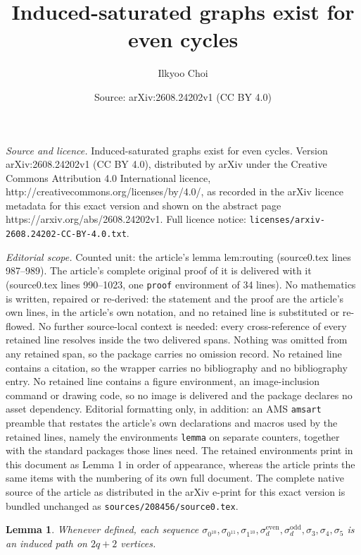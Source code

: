 \documentclass[10pt,a4paper]{amsart}
\title{Induced-saturated graphs exist for even cycles}
\author{Ilkyoo Choi}
\date{Source: arXiv:2608.24202v1 (CC BY 4.0)}
\newtheorem{lemma}{Lemma}
\begin{document}
\maketitle

\noindent\emph{Source and licence.} Induced-saturated graphs exist for even cycles. Version arXiv:2608.24202v1 (CC BY 4.0), distributed by arXiv under the Creative Commons Attribution 4.0 International licence, http://creativecommons.org/licenses/by/4.0/, as recorded in the arXiv licence metadata for this exact version and shown on the abstract page https://arxiv.org/abs/2608.24202v1. Full licence notice: \texttt{licenses/arxiv-2608.24202-CC-BY-4.0.txt}.\par\smallskip

\noindent\textit{Editorial scope.} Counted unit: the article's lemma lem:routing (source0.tex lines 987--989). The article's complete original proof of it is delivered with it (source0.tex lines 990--1023, one \texttt{proof} environment of 34 lines). No mathematics is written, repaired or re-derived: the statement and the proof are the article's own lines, in the article's own notation, and no retained line is substituted or re-flowed.  No further source-local context is needed: every cross-reference of every retained line resolves inside the two delivered spans.  Nothing was omitted from any retained span, so the package carries no omission record.  No retained line contains a citation, so the wrapper carries no bibliography and no bibliography entry.  No retained line contains a figure environment, an image-inclusion command or drawing code, so no image is delivered and the package declares no asset dependency.  Editorial formatting only, in addition: an AMS \texttt{amsart} preamble that restates the article's own declarations and macros used by the retained lines, namely the environments \texttt{lemma} on separate counters, together with the standard packages those lines need.  The retained environments print in this document as Lemma 1 in order of appearance, whereas the article prints the same items with the numbering of its own full document.  The complete native source of the article as distributed in the arXiv e-print for this exact version is bundled unchanged as \texttt{sources/208456/source0.tex}.
\begin{lemma}\label{lem:routing}
Whenever defined, each sequence $\sigma_{0^{10}}, \sigma_{0^{11}}, \sigma_{1^{10}}, \sigma^{\mathrm{even}}_{d}, \sigma^{\mathrm{odd}}_{d}, \sigma_{3}, \sigma_{4}, \sigma_{5}$ is an induced path on $2q+2$ vertices. 
\end{lemma}
\end{document}
